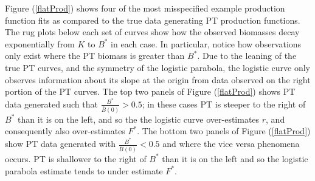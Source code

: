 \documentclass[12pt]{article}
\begin{document}
%
Figure (\ref{flatProd}) shows four of the most misspecified example
production function fits as compared to the true data generating PT production
functions. The rug plots below each set of curves show how the observed 
biomasses decay exponentially from $K$ to $B^*$ in each case. In particular,
notice how observations only exist where the PT biomass is greater than $B^*$.
Due to the leaning of the true PT curves, and the symmetry of the logistic 
parabola, the logistic curve only observes information about its slope at the 
origin from data observed on the right portion of the PT curves. The top two 
panels of Figure (\ref{flatProd}) shows PT data generated such 
that $\frac{B^*}{\bar B(0)}>0.5$; in these cases PT is steeper to the right of 
$B^*$ than it is on the left, and so the the logistic curve over-estimates $r$, 
and consequently also over-estimates $F^*$. %
The bottom two panels of Figure (\ref{flatProd}) show PT data 
generated with $\frac{B^*}{\bar B(0)}<0.5$ and where the vice versa phenomena 
occurs. PT is shallower to the right of $B^*$ than it is on the left and so the 
logistic parabola estimate tends to under estimate $F^*$.









\end{document}
